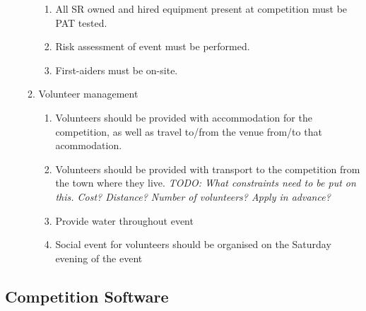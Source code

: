 \begin{enumerate}
\begin{enumerate}
  \begin{enumerate}
  \item All SR owned and hired equipment present at competition must be PAT tested.
  \item Risk assessment of event must be performed.
  \item First-aiders must be on-site.
  \end{enumerate}


\item Volunteer management
  \begin{enumerate}
  \item Volunteers should be provided with accommodation for the competition, as well as travel to/from the venue from/to that acommodation.
  \item Volunteers should be provided with transport to the competition from the town where they live. \textit{TODO: What constraints need to be put on this.  Cost?  Distance?  Number of volunteers?  Apply in advance?}

  \item Provide water throughout event
  \item Social event for volunteers should be organised on the Saturday evening of the event

  \end{enumerate}

  \end{enumerate}
\end{enumerate}


\subsection{Competition Software}

